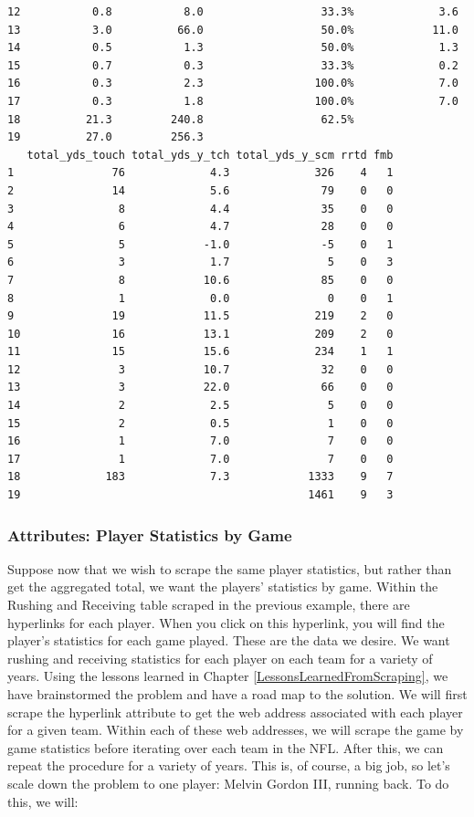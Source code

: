 \documentclass[
]{article}
\begin{document}
\begin{verbatim}
12           0.8           8.0                  33.3%             3.6
13           3.0          66.0                  50.0%            11.0
14           0.5           1.3                  50.0%             1.3
15           0.7           0.3                  33.3%             0.2
16           0.3           2.3                 100.0%             7.0
17           0.3           1.8                 100.0%             7.0
18          21.3         240.8                  62.5%                
19          27.0         256.3                                       
   total_yds_touch total_yds_y_tch total_yds_y_scm rrtd fmb
1               76             4.3             326    4   1
2               14             5.6              79    0   0
3                8             4.4              35    0   0
4                6             4.7              28    0   0
5                5            -1.0              -5    0   1
6                3             1.7               5    0   3
7                8            10.6              85    0   0
8                1             0.0               0    0   1
9               19            11.5             219    2   0
10              16            13.1             209    2   0
11              15            15.6             234    1   1
12               3            10.7              32    0   0
13               3            22.0              66    0   0
14               2             2.5               5    0   0
15               2             0.5               1    0   0
16               1             7.0               7    0   0
17               1             7.0               7    0   0
18             183             7.3            1333    9   7
19                                            1461    9   3
\end{verbatim}

\hypertarget{attributes-player-statistics-by-game}{%
\subsubsection{Attributes: Player Statistics by Game}\label{attributes-player-statistics-by-game}}

Suppose now that we wish to scrape the same player statistics, but rather than get the aggregated total, we want the players' statistics by game. Within the Rushing and Receiving table scraped in the previous example, there are hyperlinks for each player. When you click on this hyperlink, you will find the player's statistics for each game played. These are the data we desire. We want rushing and receiving statistics for each player on each team for a variety of years. Using the lessons learned in Chapter \ref{LessonsLearnedFromScraping}, we have brainstormed the problem and have a road map to the solution. We will first scrape the hyperlink attribute to get the web address associated with each player for a given team. Within each of these web addresses, we will scrape the game by game statistics before iterating over each team in the NFL. After this, we can repeat the procedure for a variety of years. This is, of course, a big job, so let's scale down the problem to one player: Melvin Gordon III, running back. To do this, we will:
\end{document}
